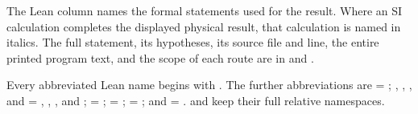 \documentclass[aps,prx,onecolumn,10pt,notitlepage,nofootinbib,longbibliography]{revtex4-2}
\numberwithin{equation}{section}
\numberwithin{table}{section}
\begin{document}
The Lean column names the formal statements used for the result. Where an
SI calculation completes the displayed physical result, that calculation
is named in italics. The full statement, its hypotheses, its source file
and line, the entire printed program text, and the scope of each route are
in  and
.

Every abbreviated Lean name begins with .
The further abbreviations are
 = ;
, , , and  =
, ,
, and ;
 = ;
 = ;
 = ; and
 = .
 and  keep their full relative namespaces.

\begingroup
\footnotesize
\setlength{\tabcolsep}{3pt}
\renewcommand{\arraystretch}{1.10}
\end{document}
